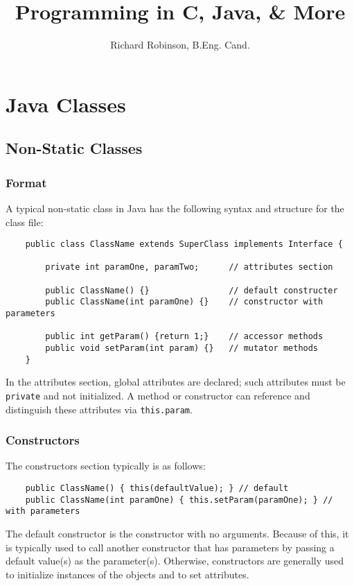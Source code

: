 \documentclass[oneside,11pt]{book}
\title{\Huge{\textbf{Programming in C, Java, \& More}}}
\author{Richard Robinson, B.Eng. Cand.}
\begin{document}
\maketitle
\tableofcontents
\setlength{\parindent}{0pt}

\chapter{Java Classes}

\section{Non-Static Classes}

\subsection{Format}

A typical non-static class in Java has the following syntax and structure for the class file:
\begin{verbatim}
    public class ClassName extends SuperClass implements Interface {

        private int paramOne, paramTwo;      // attributes section

        public ClassName() {}                // default constructer
        public ClassName(int paramOne) {}    // constructor with parameters

        public int getParam() {return 1;}    // accessor methods
        public void setParam(int param) {}   // mutator methods
    }
\end{verbatim}

In the attributes section, global attributes are declared; such attributes must be \verb$private$ and not initialized. A method or constructor can reference and distinguish these attributes via \verb$this.param$.

\subsection{Constructors}

The constructors section typically is as follows:
\begin{verbatim}
    public ClassName() { this(defaultValue); } // default
    public ClassName(int paramOne) { this.setParam(paramOne); } // with parameters
\end{verbatim}
The default constructor is the constructor with no arguments. Because of this, it is typically used to call another constructor that has parameters by passing a default value(s) as the parameter(s). Otherwise, constructors are generally used to initialize instances of the objects and to set attributes.
\end{document}
